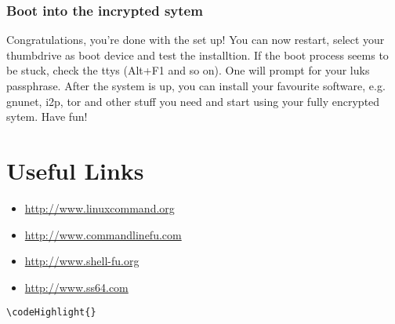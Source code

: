 \documentclass[12pt,a4paper]{article}
\begin{document}
\subsubsection{Boot into the incrypted sytem}
Congratulations, you're done with the set up! You can now restart, select your thumbdrive as boot device and test the installtion. If the boot process seems to be stuck, check the ttys (Alt+F1 and so on). One will prompt for your luks passphrase. After the system is up, you can install your favourite software, e.g. gnunet, i2p, tor and other stuff you need and start using your fully encrypted sytem. Have fun!

\section{Useful Links}
\begin{itemize}
\item{\url{http://www.linuxcommand.org}}
\item{\url{http://www.commandlinefu.com}}
\item{\url{http://www.shell-fu.org}}
\item{\url{http://www.ss64.com}}
\end{itemize}
\begin{Verbatim}[commandchars=\\\{\}]
\codeHighlight{}
\end{Verbatim}
\end{document}
